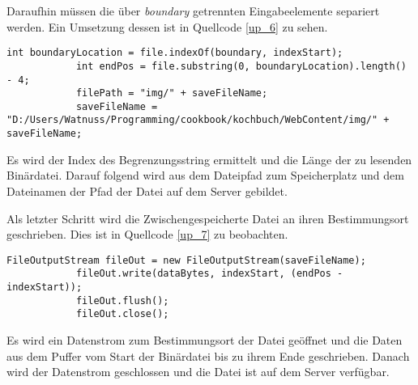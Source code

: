 Daraufhin müssen die über \textit{boundary} getrennten Eingabeelemente separiert werden. Ein Umsetzung dessen ist in Quellcode \ref{up_6} zu sehen.
\begin{lstlisting}[caption={Trennung der Eingabeelemente nach dem Begrenzungsstring},label=YourLabel]
            int boundaryLocation = file.indexOf(boundary, indexStart);
			int endPos = file.substring(0, boundaryLocation).length() - 4;
			filePath = "img/" + saveFileName;
			saveFileName = "D:/Users/Watnuss/Programming/cookbook/kochbuch/WebContent/img/"	+ saveFileName;
\end{lstlisting}
Es wird der Index des Begrenzungsstring ermittelt und die Länge der zu lesenden Binärdatei. Darauf folgend wird aus dem Dateipfad zum Speicherplatz und dem Dateinamen der Pfad der Datei auf dem Server gebildet.

Als letzter Schritt wird die Zwischengespeicherte Datei an ihren Bestimmungsort geschrieben. Dies ist in Quellcode \ref{up_7} zu beobachten.
\begin{lstlisting}[caption={Speichern der Datei auf dem Server},label=up_7]
			FileOutputStream fileOut = new FileOutputStream(saveFileName);
			fileOut.write(dataBytes, indexStart, (endPos - indexStart));
			fileOut.flush();
			fileOut.close();
\end{lstlisting}
Es wird ein Datenstrom zum Bestimmungsort der Datei geöffnet und die Daten aus dem Puffer vom Start der Binärdatei bis zu ihrem Ende geschrieben. Danach wird der Datenstrom geschlossen und die Datei ist auf dem Server verfügbar.




